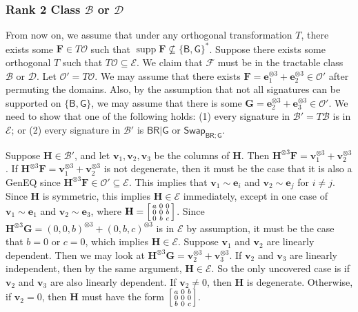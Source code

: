 \documentclass[11pt]{article}
\DeclareMathOperator{\supp}{supp}
\newcommand{\db}{\mathsf{B}}
\newcommand{\dg}{\mathsf{G}}
\newcommand{\dr}{\mathsf{R}}
\newcommand{\geneq}{\textsf{GenEQ}\xspace}
\newcommand{\swhelper}[1]{$\mathsf{Swap}_{#1}$\xspace}
\newcommand{\swbr}{\swhelper{\db \dr; \dg}}
\newcommand{\teh}{^{\otimes 3}}
\newcommand{\tractE}{$\mathscr{B}$\xspace}
\newcommand{\tractBGR}{$\mathscr{D}$\xspace}
\begin{document}
\subsubsection{Rank 2 Class \texorpdfstring{\tractE}{B} or \texorpdfstring{\tractBGR}{D}}
\label{subsec:cannot-be-made-bg}
From now on, we assume that under any orthogonal transformation $T$, there exists some $\mathbf{F} \in T \mathcal{O}$ such that $\supp \mathbf{F} \not \subseteq \{\db, \dg\}^*$.
Suppose there exists some orthogonal $T$ such that $T \mathcal{O} \subseteq \mathcal{E}$.
We claim that $\mathcal{F}$ must be in the tractable class \tractE or \tractBGR.
Let $\mathcal{O}' = T \mathcal{O}$.
We may assume that there exists $\mathbf{F} = \mathbf{e}_1\teh + \mathbf{e}_2\teh \in \mathcal{O}'$ after permuting the domains.
Also, by the assumption that not all signatures can be supported on $\{\db, \dg\}$, we may assume that there is some $\mathbf{G} = \mathbf{e}_2\teh + \mathbf{e}_3\teh \in \mathcal{O}'$.
We need to show that one of the following holds: 
(1) every signature in $\mathcal{B}' = T \mathcal{B}$ is in $\mathcal{E}$;
or 
(2) every signature in $\mathcal{B}'$ is $\db \dr | \dg$ or \swbr. 

Suppose $\mathbf{H} \in \mathcal{B}'$, 
and let $\mathbf{v}_1, \mathbf{v}_2, \mathbf{v}_3$ be the columns of $\mathbf{H}$.
Then $\mathbf{H}\teh \mathbf{F} = \mathbf{v}_1\teh + \mathbf{v}_2\teh$.
If $\mathbf{H}\teh \mathbf{F} = \mathbf{v}_1\teh + \mathbf{v}_2\teh$ is not degenerate, then it must be the case that it is also a \geneq since $\mathbf{H} \teh \mathbf{F} \in \mathcal{O}' \subseteq \mathcal{E}$.
This implies that $\mathbf{v}_1 \sim \mathbf{e}_i$ and $\mathbf{v}_2 \sim \mathbf{e}_j$ for $i \ne j$.
Since $\mathbf{H}$ is symmetric, this implies $\mathbf{H} \in \mathcal{E}$ immediately, except in one case of $\mathbf{v}_1 \sim \mathbf{e}_1$ and $\mathbf{v}_2 \sim \mathbf{e}_3$, where $\mathbf{H} = \begin{bsmallmatrix}
  a & 0 & 0 \\
  0 & 0 & b \\
  0 & b & c
\end{bsmallmatrix}$.
Since $\mathbf{H} \teh \mathbf{G} = (0, 0, b)\teh + (0, b, c)\teh$ is in $\mathcal{E}$ by assumption, it must be the case that $b = 0$ or $c = 0$, which implies $\mathbf{H} \in \mathcal{E}$.
Suppose $\mathbf{v}_1$ and $\mathbf{v}_2$ are linearly dependent.
Then we may look at $\mathbf{H}\teh \mathbf{G} = \mathbf{v}_2\teh + \mathbf{v}_3\teh$.
If $\mathbf{v}_2$ and $\mathbf{v}_3$ are linearly independent, then by the same argument, $\mathbf{H} \in \mathcal{E}$.
So the only uncovered case is if $\mathbf{v}_2$ and $\mathbf{v}_3$ are also linearly dependent.
If $\mathbf{v}_2 \ne 0$, then $\mathbf{H}$ is degenerate.
Otherwise, if $\mathbf{v}_2 = 0$, then $\mathbf{H}$ must have the form $\begin{bsmallmatrix}
  a & 0 & b \\
  0 & 0 & 0 \\
  b & 0 & c
\end{bsmallmatrix}$.
\end{document}
